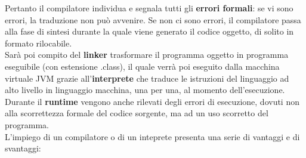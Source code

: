 \documentclass[a4paper]{extarticle}
\begin{document}
\vspace{1em}
\noindent
Pertanto il compilatore individua e segnala tutti gli \textbf{errori formali}: se vi sono errori, la traduzione non può avvenire. Se non ci sono errori, il compilatore passa alla fase di sintesi durante la quale viene generato il codice oggetto, di solito in formato rilocabile.\\
Sarà poi compito del \textbf{linker} trasformare il programma oggetto in programma eseguibile (con estensione .class), il quale verrà poi eseguito dalla macchina virtuale JVM grazie all'\textbf{interprete} che traduce le istruzioni del linguaggio ad alto livello in linguaggio macchina, una per una, al momento dell’esecuzione.\\
Durante il \textbf{runtime} vengono anche rilevati degli errori di esecuzione, dovuti non alla scorrettezza formale del codice sorgente, ma ad un uso scorretto del programma.\\
L'impiego di un compilatore o di un inteprete presenta una serie di vantaggi e di svantaggi:
\end{document}

